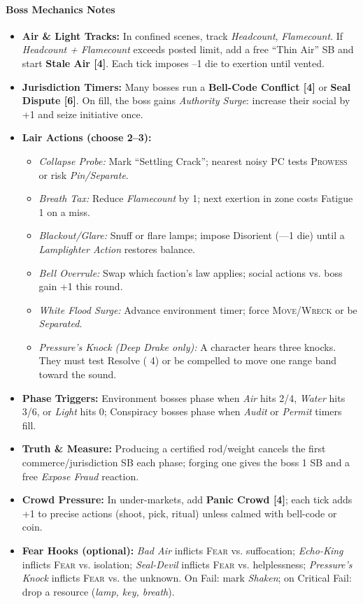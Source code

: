 \paragraph{Boss Mechanics Notes}
\begin{itemize}
  \item \textbf{Air \& Light Tracks:} In confined scenes, track \emph{Headcount}, \emph{Flamecount}. If \emph{Headcount + Flamecount} exceeds posted limit, add a free ``Thin Air'' SB and start \textbf{Stale Air [4]}. Each tick imposes --1 die to exertion until vented.
  \item \textbf{Jurisdiction Timers:} Many bosses run a \textbf{Bell-Code Conflict [4]} or \textbf{Seal Dispute [6]}. On fill, the boss gains \emph{Authority Surge}: increase their social \DV{} by +1 and seize initiative once.
  \item \textbf{Lair Actions (choose 2--3):}
    \begin{itemize}
      \item \emph{Collapse Probe:} Mark ``Settling Crack''; nearest noisy PC tests \textsc{Prowess} or risk \emph{Pin/Separate}.
      \item \emph{Breath Tax:} Reduce \emph{Flamecount} by 1; next exertion in zone costs Fatigue 1 on a miss.
      \item \emph{Blackout/Glare:} Snuff or flare lamps; impose Disorient (---1 die) until a \emph{Lamplighter Action} restores balance.
      \item \emph{Bell Overrule:} Swap which faction's law applies; social actions vs. boss gain +1 \DV{} this round.
      \item \emph{White Flood Surge:} Advance environment timer; force \textsc{Move}/\textsc{Wreck} or be \emph{Separated}.
      \item \emph{Pressure's Knock (Deep Drake only):} A character hears three knocks. They must test Resolve (\DV{} 4) or be compelled to move one range band toward the sound.
    \end{itemize}
  \item \textbf{Phase Triggers:} Environment bosses phase when \emph{Air} hits 2/4, \emph{Water} hits 3/6, or \emph{Light} hits 0; Conspiracy bosses phase when \emph{Audit} or \emph{Permit} timers fill.
  \item \textbf{Truth \& Measure:} Producing a certified rod/weight cancels the first commerce/jurisdiction SB each phase; forging one gives the boss 1 SB and a free \emph{Expose Fraud} reaction.
  \item \textbf{Crowd Pressure:} In under-markets, add \textbf{Panic Crowd [4]}; each tick adds +1 \DV{} to precise actions (shoot, pick, ritual) unless calmed with bell-code or coin.
  \item \textbf{Fear Hooks (optional):} \emph{Bad Air} inflicts \textsc{Fear} vs. suffocation; \emph{Echo-King} inflicts \textsc{Fear} vs. isolation; \emph{Seal-Devil} inflicts \textsc{Fear} vs. helplessness; \emph{Pressure's Knock} inflicts \textsc{Fear} vs. the unknown. On Fail: mark \emph{Shaken}; on Critical Fail: drop a resource (\emph{lamp, key, breath}).
\end{itemize}

